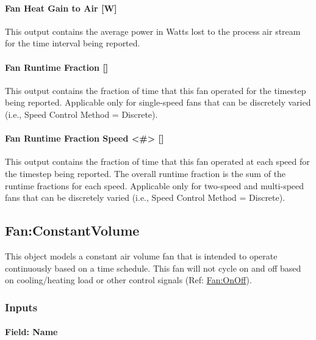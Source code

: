 \paragraph{Fan Heat Gain to Air {[}W{]}}\label{fan-heat-gain-to-air-fansysmodel}

This output contains the average power in Watts lost to the process air stream for the time interval being reported.

\paragraph{Fan Runtime Fraction {[]}}\label{fan-runtime-fraction-fansysmodel}

This output contains the fraction of time that this fan operated for the timestep being reported. Applicable only for single-speed fans that can be discretely varied (i.e., Speed Control Method = Discrete).

\paragraph{Fan Runtime Fraction Speed <\#> {[]}}\label{fan-runtime-fraction-speed-fansysmodel}

This output contains the fraction of time that this fan operated at each speed for the timestep being reported. The overall runtime fraction is the sum of the runtime fractions for each speed. Applicable only for two-speed and multi-speed fans that can be discretely varied (i.e., Speed Control Method = Discrete).

\subsection{Fan:ConstantVolume}\label{fanconstantvolume}

This object models a constant air volume fan that is intended to operate continuously based on a time schedule. This fan will not cycle on and off based on cooling/heating load or other control signals (Ref: \hyperref[fanonoff]{Fan:OnOff}).

\subsubsection{Inputs}\label{inputs-019}

\paragraph{Field: Name}\label{field-name-018}

